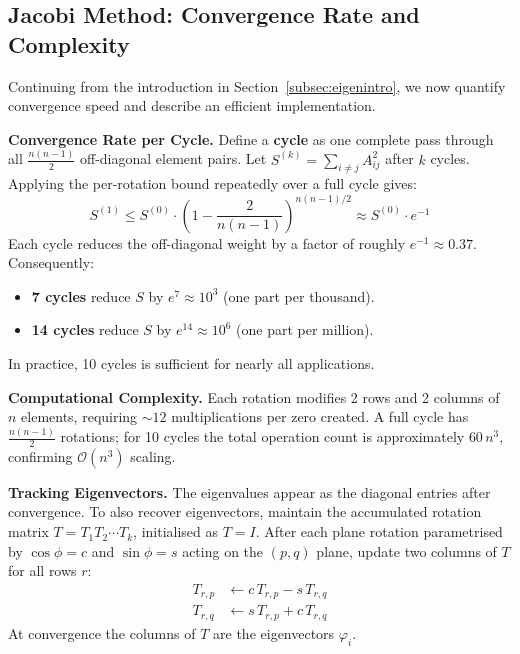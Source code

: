 \documentclass[12pt, a4paper]{article}
\begin{document}
\subsection{Jacobi Method: Convergence Rate and Complexity}
\label{subsec:jacobi_convergence}
Continuing from the introduction in Section~\ref{subsec:eigenintro}, we now quantify convergence speed and describe an efficient implementation.

\textbf{Convergence Rate per Cycle.} Define a \textbf{cycle} as one complete pass through all $\frac{n(n-1)}{2}$ off-diagonal element pairs. Let $S^{(k)} = \sum_{i \neq j} A_{ij}^2$ after $k$ cycles. Applying the per-rotation bound repeatedly over a full cycle gives:
\begin{equation}
S^{(1)} \leq S^{(0)} \cdot \left(1 - \frac{2}{n(n-1)}\right)^{n(n-1)/2} \approx S^{(0)} \cdot e^{-1}
\end{equation}
Each cycle reduces the off-diagonal weight by a factor of roughly $e^{-1} \approx 0.37$. Consequently:
\begin{itemize}
    \item \textbf{7 cycles} reduce $S$ by $e^7 \approx 10^3$ (one part per thousand).
    \item \textbf{14 cycles} reduce $S$ by $e^{14} \approx 10^6$ (one part per million).
\end{itemize}
In practice, 10 cycles is sufficient for nearly all applications.

\textbf{Computational Complexity.} Each rotation modifies 2 rows and 2 columns of $n$ elements, requiring $\sim 12$ multiplications per zero created. A full cycle has $\frac{n(n-1)}{2}$ rotations; for 10 cycles the total operation count is approximately $60\,n^3$, confirming $\mathcal{O}(n^3)$ scaling.

\textbf{Tracking Eigenvectors.} The eigenvalues appear as the diagonal entries after convergence. To also recover eigenvectors, maintain the accumulated rotation matrix $T = T_1 T_2 \cdots T_k$, initialised as $T = I$. After each plane rotation parametrised by $\cos\phi = c$ and $\sin\phi = s$ acting on the $(p,q)$ plane, update two columns of $T$ for all rows $r$:
\begin{align}
T_{r,p} &\leftarrow c\, T_{r,p} - s\, T_{r,q} \\
T_{r,q} &\leftarrow s\, T_{r,p} + c\, T_{r,q}
\end{align}
At convergence the columns of $T$ are the eigenvectors $\varphi_i$.
\end{document}
